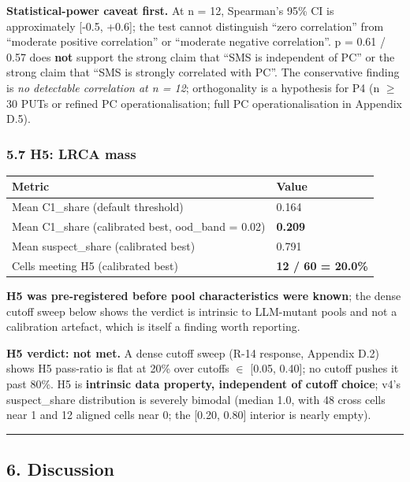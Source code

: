 \documentclass[review,12pt,authoryear]{elsarticle}
\newcounter{none}                   %
\begin{document}
\textbf{Statistical-power caveat first.} At n = 12, Spearman's 95\% CI
is approximately {[}-0.5, +0.6{]}; the test cannot distinguish ``zero
correlation'' from ``moderate positive correlation'' or ``moderate
negative correlation''. p = 0.61 / 0.57 does \textbf{not} support the
strong claim that ``SMS is independent of PC'' or the strong claim that
``SMS is strongly correlated with PC''. The conservative finding is
\emph{no detectable correlation at n = 12}; orthogonality is a
hypothesis for P4 (n $\geq$ 30 PUTs or refined PC operationalisation; full PC
operationalisation in Appendix D.5).

\subsubsection{5.7 H5: LRCA mass}\label{h5-lrca-mass}

{\def\LTcaptype{none} %
\begin{longtable}[]{@{}ll@{}}
\toprule\noalign{}
Metric & Value \\
\midrule\noalign{}
\endhead
\bottomrule\noalign{}
\endlastfoot
Mean C1\_share (default threshold) & 0.164 \\
Mean C1\_share (calibrated best, ood\_band = 0.02) & \textbf{0.209} \\
Mean suspect\_share (calibrated best) & 0.791 \\
Cells meeting H5 (calibrated best) & \textbf{12 / 60 = 20.0\%} \\
\end{longtable}
}

\textbf{H5 was pre-registered before pool characteristics were known};
the dense cutoff sweep below shows the verdict is intrinsic to
LLM-mutant pools and not a calibration artefact, which is itself a
finding worth reporting.

\textbf{H5 verdict: not met.} A dense cutoff sweep (R-14 response,
Appendix D.2) shows H5 pass-ratio is flat at 20\% over cutoffs $\in$
{[}0.05, 0.40{]}; no cutoff pushes it past 80\%. H5 is \textbf{intrinsic
data property, independent of cutoff choice}; v4's suspect\_share
distribution is severely bimodal (median 1.0, with 48 cross cells near 1
and 12 aligned cells near 0; the {[}0.20, 0.80{]} interior is nearly
empty).

\begin{center}\rule{0.5\linewidth}{0.5pt}\end{center}

\subsection{6. Discussion}\label{discussion}
\end{document}

